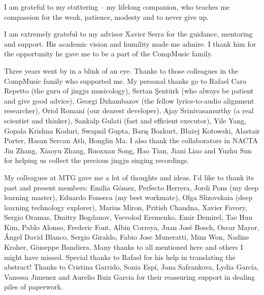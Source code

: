 
I am grateful to my stuttering -- my lifelong companion, who teaches me compassion for the weak, patience, modesty and to never give up.

I am extremely grateful to my advisor Xavier Serra for the guidance, mentoring and support. His academic vision and humility made me admire. I thank him for the opportunity he gave me to be a part of the CompMusic family.

Three years went by in a blink of an eye. Thanks to those colleagues in the CompMusic family who supported me. My personal thanks go to Rafael Caro Repetto (the guru of jingju musicology), Sertan Şentürk (who always be patient and give good advice), Georgi Dzhambazov (the fellow lyrics-to-audio alignment researcher), Oriol Romaní (our dearest developer), Ajay Srinivasamurthy (a real scientist and thinker), Sankalp Gulati (fast and efficient executor), Yile Yang, Gopala Krishna Koduri, Swapnil Gupta, Barış Bozkurt, Błażej Kotowski, Alastair Porter, Hasan Sercan Atlı, Honglin Ma. I also thank the collaborators in NACTA Jin Zhang, Xiaoyu Zhang, Ruoxuan Song, Hao Tian, Jiani Liao and Yuzhu Sun for helping us collect the precious jingju singing recordings.

My colleagues at MTG gave me a lot of thoughts and ideas. I'd like to thank its past and present members: Emilia Gómez, Perfecto Herrera, Jordi Pons (my deep learning master), Eduardo Fonseca (my best workmate), Olga Slizovskaia (deep learning technology explorer), Marius Miron, Pritish Chandna, Xavier Favory, Sergio Oramas, Dmitry Bogdanov, Vsevolod Eremenko, Emir Demirel, Tae Hun Kim, Pablo Alonso, Frederic Font, Albin Correya, Juan José Bosch, Oscar Mayor, Ángel David Blanco, Sergio Giraldo, Fabio Jose Muneratti, Minz Won, Nadine Kroher, Giuseppe Bandiera. Many thanks to all mentioned here and others I might have missed. Special thanks to Rafael for his help in translating the abstract! Thanks to Cristina Garrido, Sonia Espí, Jana Safrankova, Lydia García, Vanessa Jimenez and Aurelio Ruiz Garcia for their reassuring support in dealing piles of paperwork. 

